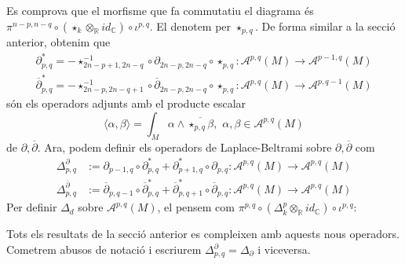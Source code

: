 Es comprova que el morfisme que fa commutatiu el diagrama és $\pi^{n-p,n-q}\circ(\star_{k}\otimes_{\mathbb{R}}id_{\mathbb{C}})\circ\iota^{p,q}$. El denotem per $\star_{p,q}$. De forma similar a la secció anterior, obtenim que
\begin{align*}
    \partial_{p,q}^{*}
    =-\star_{2n-p+1,2n-q}^{-1}\circ\partial_{2n-p,2n-q}\circ\star_{p,q}
    :\mathcal{A}^{p,q}(M)\rightarrow\mathcal{A}^{p-1,q}(M)\\
    \overline{\partial}_{p,q}^{*}
    =-\star_{2n-p,2n-q+1}^{-1}\circ\overline{\partial}_{2n-p,2n-q}\circ\star_{p,q}
    :\mathcal{A}^{p,q}(M)\rightarrow\mathcal{A}^{p,q-1}(M)
\end{align*}
són els operadors adjunts amb el producte escalar
\begin{equation*}
    \langle\alpha,\beta\rangle
    =\int_{M}\alpha\wedge\overline{\star_{p,q}\beta},\,\,\alpha,\beta\in\mathcal{A}^{p,q}(M)
\end{equation*}
de $\partial,\overline{\partial}$. Ara, podem definir els operadors de Laplace-Beltrami sobre $\partial,\overline{\partial}$ com
\begin{align*}
    \Delta_{p,q}^{\partial}
    &:=\partial_{p-1,q}\circ\partial_{p,q}^{*}+\partial_{p+1,q}^{*}\circ\partial_{p,q}
    :\mathcal{A}^{p,q}(M)\rightarrow\mathcal{A}^{p,q}(M)\\
    \Delta_{p,q}^{\overline{\partial}}
    &:=\overline{\partial}_{p,q-1}\circ\overline{\partial}_{p,q}^{*}+\overline{\partial}_{p,q+1}^{*}\circ\overline{\partial}_{p,q}
    :\mathcal{A}^{p,q}(M)\rightarrow\mathcal{A}^{p,q}(M)
\end{align*}
Per definir $\Delta_{d}$ sobre $\mathcal{A}^{p,q}(M)$, el pensem com $\pi^{p,q}\circ(\Delta_{k}^{p}\otimes_{\mathbb{R}}id_{\mathbb{C}})\circ\iota^{p,q}$:
\begin{center}
\end{center}
Tots els resultats de la secció anterior es compleixen amb aquests nous operadors. Cometrem abusos de notació i escriurem $\Delta_{p,q}^{\partial}=\Delta_{\partial}$ i viceversa.
